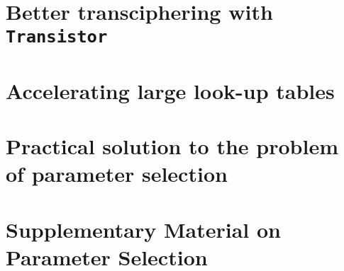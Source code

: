 \documentclass[11pt, twoside, openright]{thesis}
\begin{document}
\chapter[Better transciphering with Transistor]{Better transciphering with \texttt{Transistor}}
\label{chap:transistor}



\chapter{Accelerating large look-up tables}
\label{chap:larger_lut}


\chapter{Practical solution to the problem of parameter selection}
\label{chap:parameters}


%

\appendix
\chapter{Supplementary Material on Parameter Selection}






\end{document}
